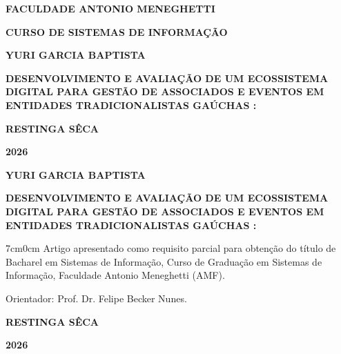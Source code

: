 \documentclass[12pt,a4paper]{article}
\newcommand{\instituicao}{FACULDADE ANTONIO MENEGHETTI}
\newcommand{\curso}{CURSO DE SISTEMAS DE INFORMAÇÃO}
\newcommand{\autor}{YURI GARCIA BAPTISTA}
\newcommand{\titulo}{DESENVOLVIMENTO E AVALIAÇÃO DE UM ECOSSISTEMA DIGITAL PARA GESTÃO DE ASSOCIADOS E EVENTOS EM ENTIDADES TRADICIONALISTAS GAÚCHAS}
\newcommand{\subtitulo}{}
\newcommand{\grau}{Bacharel em Sistemas de Informação}
\newcommand{\orientador}{Prof. Dr. Felipe Becker Nunes}
\newcommand{\cidade}{RESTINGA SÊCA}
\newcommand{\ano}{2026}
\newcommand{\imprimirtitulo}{%
  \titulo%
  \if\relax\detokenize\expandafter{\subtitulo}\relax
  \else: \subtitulo\fi
}
\begin{document}
\hypersetup{pageanchor=false}

\begin{titlepage}
  \thispagestyle{empty}
  \centering
  {\bfseries\MakeUppercase{\instituicao}\par}
  {\bfseries\MakeUppercase{\curso}\par}

  \vspace{2\baselineskip}
  {\bfseries\MakeUppercase{\autor}\par}

  \vfill
  {\bfseries\MakeUppercase{\imprimirtitulo}\par}
  \vfill

  {\bfseries\MakeUppercase{\cidade}\par}
  {\bfseries\ano\par}
\end{titlepage}

\begin{titlepage}
  \thispagestyle{empty}
  \centering
  {\bfseries\MakeUppercase{\autor}\par}

  \vspace{8\baselineskip}
  {\bfseries\MakeUppercase{\imprimirtitulo}\par}

  \vspace{4\baselineskip}
  \begin{adjustwidth}{7cm}{0cm}
    \singlespacing
    \noindent Artigo apresentado como requisito parcial para obtenção do título de
    \grau, Curso de Graduação em Sistemas de Informação, Faculdade Antonio
    Meneghetti (AMF).

    \vspace{\baselineskip}
    \noindent Orientador: \orientador.
  \end{adjustwidth}

  \vfill
  {\bfseries\MakeUppercase{\cidade}\par}
  {\bfseries\ano\par}
\end{titlepage}
\end{document}
